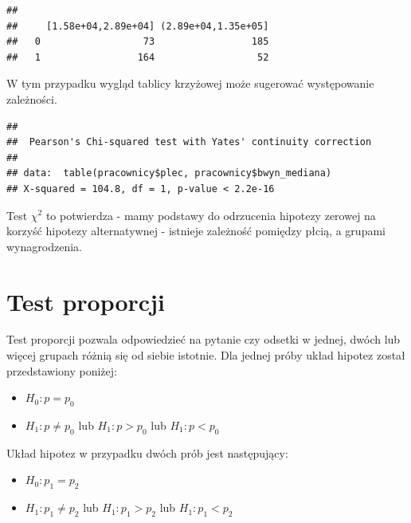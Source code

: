 \documentclass[
]{book}
\newenvironment{Shaded}{\begin{snugshade}}{\end{snugshade}}
\newcommand{\KeywordTok}[1]{\textcolor[rgb]{0.13,0.29,0.53}{\textbf{#1}}}
\newcommand{\NormalTok}[1]{#1}
\newcommand{\OperatorTok}[1]{\textcolor[rgb]{0.81,0.36,0.00}{\textbf{#1}}}
\providecommand{\tightlist}{%
  \setlength{\itemsep}{0pt}\setlength{\parskip}{0pt}}
\begin{document}
\begin{verbatim}
##    
##     [1.58e+04,2.89e+04] (2.89e+04,1.35e+05]
##   0                  73                 185
##   1                 164                  52
\end{verbatim}

W tym przypadku wygląd tablicy krzyżowej może sugerować występowanie zależności.

\begin{Shaded}
\end{Shaded}

\begin{verbatim}
## 
##  Pearson's Chi-squared test with Yates' continuity correction
## 
## data:  table(pracownicy$plec, pracownicy$bwyn_mediana)
## X-squared = 104.8, df = 1, p-value < 2.2e-16
\end{verbatim}

Test \(\chi^2\) to potwierdza - mamy podstawy do odrzucenia hipotezy zerowej na korzyść hipotezy alternatywnej - istnieje zależność pomiędzy płcią, a grupami wynagrodzenia.

\hypertarget{test-proporcji}{%
\section{Test proporcji}\label{test-proporcji}}

Test proporcji pozwala odpowiedzieć na pytanie czy odsetki w jednej, dwóch lub więcej grupach różnią się od siebie istotnie. Dla jednej próby układ hipotez został przedstawiony poniżej:

\begin{itemize}
\tightlist
\item
  \(H_0: p=p_0\)
\item
  \(H_1: p \neq p_0\) lub \(H_1: p > p_0\) lub \(H_1: p < p_0\)
\end{itemize}

Układ hipotez w przypadku dwóch prób jest następujący:

\begin{itemize}
\tightlist
\item
  \(H_0: p_1=p_2\)
\item
  \(H_1: p_1 \neq p_2\) lub \(H_1: p_1 > p_2\) lub \(H_1: p_1 < p_2\)
\end{itemize}
\end{document}
